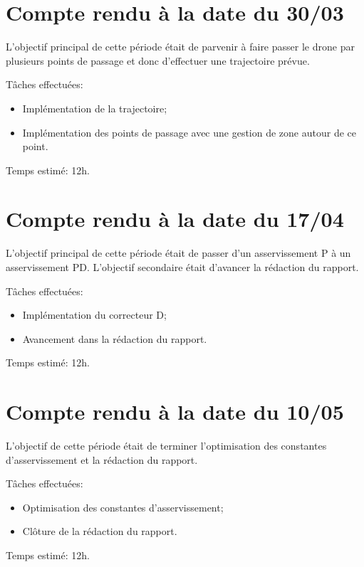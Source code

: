 	\section{Compte rendu à la date du 30/03}
		L'objectif principal de cette période était de parvenir à faire passer le drone par plusieurs points de passage et donc d'effectuer une trajectoire prévue.

		Tâches effectuées:
		\begin{itemize}
			\item Implémentation de la trajectoire;
			\item Implémentation des points de passage avec une gestion de zone autour de ce point. \\
		\end{itemize}

		Temps estimé: 12h.


	\section{Compte rendu à la date du 17/04}
		L'objectif principal de cette période était de passer d'un asservissement P à un asservissement PD. L'objectif secondaire était d'avancer la rédaction du rapport.

		Tâches effectuées:
		\begin{itemize}
			\item Implémentation du correcteur D\@;
			\item Avancement dans la rédaction du rapport. \\
		\end{itemize}

		Temps estimé: 12h.


	\section{Compte rendu à la date du 10/05}
		L'objectif de cette période était de terminer l'optimisation des constantes d'asservissement et la rédaction du rapport.

		Tâches effectuées:
		\begin{itemize}
			\item Optimisation des constantes d'asservissement;
			\item Clôture de la rédaction du rapport. \\
		\end{itemize}

		Temps estimé: 12h.
